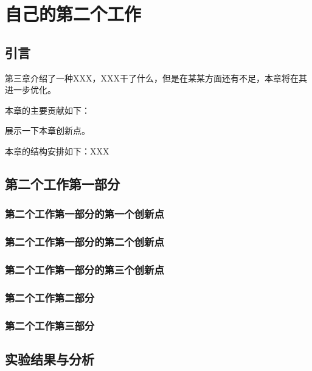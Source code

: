 \chapter{自己的第二个工作}


\section{引言}

第三章介绍了一种XXX，XXX干了什么，但是在某某方面还有不足，本章将在其进一步优化。



本章的主要贡献如下：



展示一下本章创新点。



本章的结构安排如下：XXX


\section{第二个工作第一部分}




\subsection{第二个工作第一部分的第一个创新点}


\subsection{第二个工作第一部分的第二个创新点}




\subsection{第二个工作第一部分的第三个创新点}





\subsection{第二个工作第二部分}




\subsection{第二个工作第三部分}




\section{实验结果与分析}





